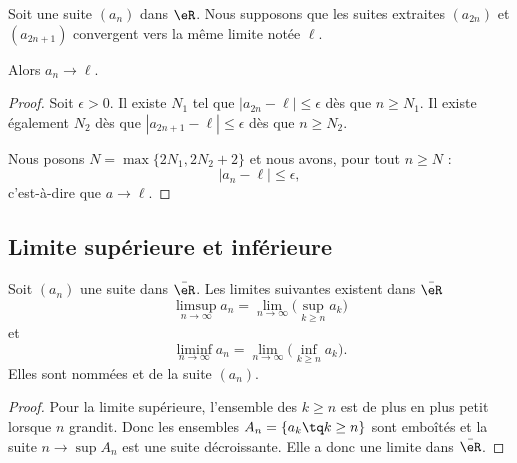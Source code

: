\begin{proposition}      \label{PROPooXOOCooGMqJNe}
	Soit une suite \( (a_n)\) dans \( \eR\).  Nous supposons que les suites extraites \( (a_{2n})\) et \( (a_{2n+1})\) convergent vers la même limite notée \( \ell\).

	Alors \( a_n\to \ell\).
\end{proposition}

\begin{proof}
	Soit \( \epsilon>0\). Il existe \( N_1\) tel que \( | a_{2n}-\ell |\leq \epsilon\) dès que \( n\geq N_1\). Il existe également \( N_2\) dès que \( | a_{2n+1}-\ell |\leq \epsilon\) dès que \( n\geq N_2\).

	Nous posons \( N=\max\{ 2N_1,2N_2+2 \}\) et nous avons, pour tout \( n\geq N\) :
	\begin{equation}
		| a_n-\ell |\leq \epsilon,
	\end{equation}
	c'est-à-dire que \( a\to \ell\).
\end{proof}

\subsection{Limite supérieure et inférieure}

\begin{lemmaDef}      \label{ooMVZAooVVCOnP}
	Soit \( (a_n)\) une suite dans \( \bar \eR\). Les limites suivantes existent dans \( \bar \eR\)
	\begin{equation}
		\limsup_{n\to\infty}a_n=\lim_{n\to \infty}\big( \sup_{k\geq n}a_k \big)
	\end{equation}
	et
	\begin{equation}
		\liminf_{n\to \infty}a_n=\lim_{n\to\infty}\big( \inf_{k\geq n}a_k \big).
	\end{equation}
	Elles sont nommées  et  de la suite \( (a_n)\).
\end{lemmaDef}

\begin{proof}
	Pour la limite supérieure, l'ensemble des \( k\geq n\) est de plus en plus petit lorsque \( n\) grandit. Donc les ensembles \( A_n=\{ a_k\tq k\geq n \}\) sont emboîtés et la suite \( n\to \sup A_n\) est une suite décroissante. Elle a donc une limite dans \( \bar \eR\).
\end{proof}


